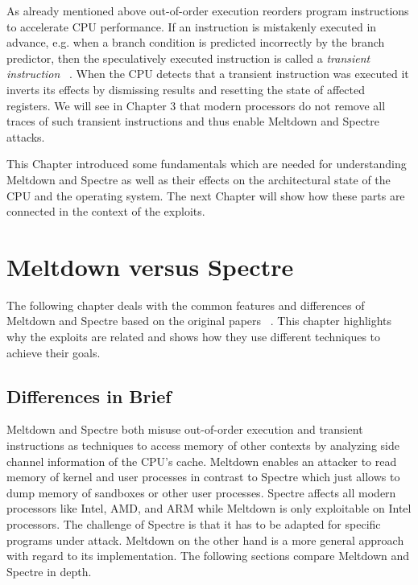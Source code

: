 \documentclass[a4paper,oneside,openright] {scrreprt}
\begin{document}
As already mentioned above out-of-order execution reorders program instructions to accelerate CPU performance.
If an instruction is mistakenly executed in advance, e.g. when a branch condition is predicted incorrectly by the branch predictor, 
then the speculatively executed instruction is called a \textit{transient instruction} ~\cite{lipp2018meltdown, kocher2018spectre}.
When the CPU detects that a transient instruction was executed it inverts its effects by dismissing results and resetting the state of affected registers.
We will see in Chapter 3 that modern processors do not remove all traces of such transient instructions and thus enable
Meltdown and Spectre attacks.

This Chapter introduced some fundamentals which are needed for understanding Meltdown and Spectre as well as their 
effects on the architectural state of the CPU and the operating system. The next Chapter will show how these parts
are connected in the context of the exploits.

\chapter{Meltdown versus Spectre}
\label{ch:contentI}

The following chapter deals with the common features and differences of Meltdown and Spectre based on the
 original papers ~\cite{lipp2018meltdown, kocher2018spectre}. This chapter highlights why the exploits are related
 and shows how they use different techniques to achieve their goals.
 
 
 \section{Differences in Brief}
 \label{ch:intro:motivation}
 
 Meltdown and Spectre both misuse out-of-order execution and transient instructions as techniques to access memory of 
 other contexts by analyzing side channel information of the CPU's cache. 
  Meltdown enables an attacker to read memory of kernel and user processes
  in contrast to Spectre which just allows to dump memory of sandboxes or other user processes. Spectre affects all modern processors like Intel, AMD, and ARM while Meltdown
 is only exploitable on Intel processors. The challenge of Spectre is that it has to be adapted for specific programs under attack. 
 Meltdown on the other hand is a more general approach with regard to its implementation. The following sections compare Meltdown and Spectre in depth.
 
\end{document}
